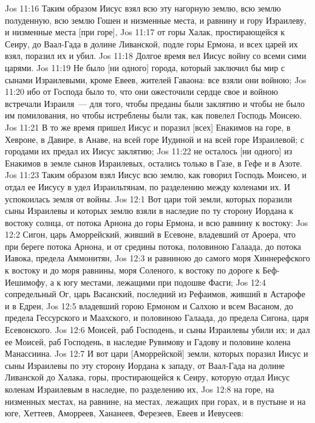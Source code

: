 \rsbpar\vs Jos 11:16 Таким образом Иисус взял всю эту нагорную землю, всю землю полуденную, всю землю Гошен и низменные места, и равнину и гору Израилеву, и низменные места [при горе],
\vs Jos 11:17 от горы Халак, простирающейся к Сеиру, до Ваал-Гада в долине Ливанской, подле горы Ермона, и всех царей их взял, поразил их и убил.
\vs Jos 11:18 Долгое время вел Иисус войну со всеми сими царями.
\vs Jos 11:19 Не было [ни одного] города, который заключил бы мир с сынами Израилевыми, кроме Евеев, жителей Гаваона: все взяли они войною;
\vs Jos 11:20 ибо от Господа было то, что они ожесточили сердце свое и войною встречали Израиля~--- для того, чтобы преданы были заклятию и чтобы не было им помилования, но чтобы истреблены были так, как повелел Господь Моисею.
\rsbpar\vs Jos 11:21 В то же время пришел Иисус и поразил [всех] Енакимов на горе, в Хевроне, в Давире, в Анаве, на всей горе Иудиной и на всей горе Израилевой; с городами их предал их Иисус заклятию;
\vs Jos 11:22 не осталось [ни одного] из Енакимов в земле сынов Израилевых, остались только в Газе, в Гефе и в Азоте.
\vs Jos 11:23 Таким образом взял Иисус всю землю, как говорил Господь Моисею, и отдал ее Иисусу в удел Израильтянам, по разделению между коленами их. И успокоилась земля от войны.
\vs Jos 12:1 Вот цари той земли, которых поразили сыны Израилевы и которых землю взяли в наследие по ту сторону Иордана к востоку солнца, от потока Арнона до горы Ермона, и всю равнину к востоку:
\vs Jos 12:2 Сигон, царь Аморрейский, живший в Есевоне, владевший от Ароера, что при береге потока Арнона, и от средины потока, половиною Галаада, до потока Иавока, предела Аммонитян,
\vs Jos 12:3 и равниною до самого моря Хиннерефского к востоку и до моря равнины, моря Соленого, к востоку по дороге к Беф-Иешимофу, а к югу местами, лежащими при подошве Фасги;
\vs Jos 12:4 сопредельный  Ог, царь Васанский, последний из Рефаимов, живший в Астарофе и в Едреи,
\vs Jos 12:5 владевший горою Ермоном и Салхою и всем Васаном, до предела Гессурского и Маахского, и половиною Галаада, до предела Сигона, царя Есевонского.
\vs Jos 12:6 Моисей, раб Господень, и сыны Израилевы убили их; и дал ее Моисей, раб Господень, в наследие  Рувимову и Гадову и половине колена Манассиина.
\rsbpar\vs Jos 12:7 И вот цари [Аморрейской] земли, которых поразил Иисус и сыны Израилевы по эту сторону Иордана к западу, от Ваал-Гада на долине Ливанской до Халака, горы, простирающейся к Сеиру, которую отдал Иисус коленам Израилевым в наследие, по разделению их,
\vs Jos 12:8 на горе, на низменных местах, на равнине, на местах, лежащих при горах, и в пустыне и на юге, Хеттеев, Аморреев, Хананеев, Ферезеев, Евеев и Иевусеев:
